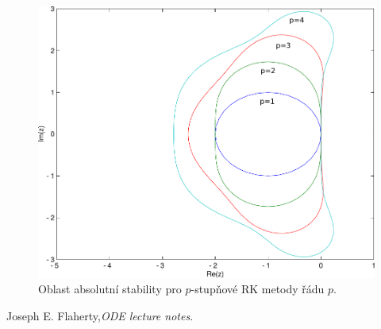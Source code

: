 \documentclass[a4paper, 12pt]{book}
\theoremstyle{definition}
\begin{document}
\begin{figure}[h]
    \label{as_rk}
    \centering
    \includegraphics[scale=0.7]{as_rk.pdf} 
    \caption{Oblast absolutní stability pro $p$-stupňové RK metody řádu $p$.}
\end{figure}









\begin{thebibliography}{9}

  Joseph E. Flaherty,\emph{ODE lecture notes}.
\end{thebibliography}
\end{document}
